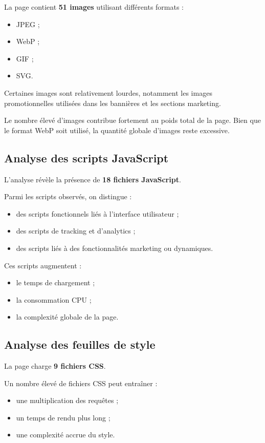 \documentclass[11pt,a4paper]{article}
\begin{document}
La page contient \textbf{51 images} utilisant différents formats :

\begin{itemize}
\item JPEG ;
\item WebP ;
\item GIF ;
\item SVG.
\end{itemize}

Certaines images sont relativement lourdes, notamment les images promotionnelles utilisées dans les bannières et les sections marketing.

Le nombre élevé d'images contribue fortement au poids total de la page. Bien que le format WebP soit utilisé, la quantité globale d'images reste excessive.

\subsection{Analyse des scripts JavaScript}

L'analyse révèle la présence de \textbf{18 fichiers JavaScript}.

Parmi les scripts observés, on distingue :
\begin{itemize}
\item des scripts fonctionnels liés à l'interface utilisateur ;
\item des scripts de tracking et d'analytics ;
\item des scripts liés à des fonctionnalités marketing ou dynamiques.
\end{itemize}

Ces scripts augmentent :
\begin{itemize}
\item le temps de chargement ;
\item la consommation CPU ;
\item la complexité globale de la page.
\end{itemize}

\subsection{Analyse des feuilles de style}

La page charge \textbf{9 fichiers CSS}.

Un nombre élevé de fichiers CSS peut entraîner :
\begin{itemize}
\item une multiplication des requêtes ;
\item un temps de rendu plus long ;
\item une complexité accrue du style.
\end{itemize}
\end{document}
